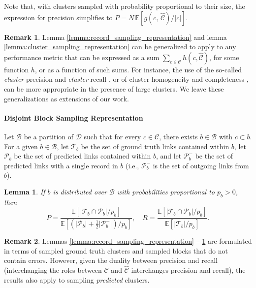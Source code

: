 \documentclass[fontsize=11pt]{article}
\newtheorem{lemma}{Lemma}
\theoremstyle{definition}
\newtheorem{remark}{Remark}
\begin{document}
Note that, with clusters sampled with probability proportional to their size, the expression for precision simplifies to
$
    P = N\, \mathbb{E} \left[ g(c,\, \widehat{\mathcal{C}})/\lvert c \rvert \right].
$

\begin{remark}
    Lemma \ref{lemma:record_sampling_representation} and lemma \ref{lemma:cluster_sampling_representation} can be generalized to apply to any performance metric that can be expressed as a sum $\sum_{c \in \mathcal{C}} h(c, \widehat{\mathcal{C}})$, for some function $h$, or as a function of such sums. For instance, the use of the so-called \textit{cluster} precision and \textit{cluster} recall \citep{Barnes2015}, or of cluster homogeneity and completeness \citep{Barnes2015}, can be more appropriate in the presence of large clusters. We leave these generalizations as extensions of our work.
\end{remark}

\paragraph{Disjoint Block Sampling Representation}

Let $\mathcal{B}$ be a partition of $\mathcal{D}$ such that for every $ c \in \mathcal{C}$, there exists $b \in \mathcal{B}$ with $c \subset b$. For a given $b \in \mathcal{B}$, let $\mathcal{T}_b$ be the set of ground truth links contained within $b$, let $\mathcal{P}_b$ be the set of predicted links contained within $b$, and let $\mathcal{P}_b^{-}$ be the set of predicted links with a single record in $b$ (i.e., $\mathcal{P}_b^{-}$ is the set of outgoing links from $b$).

\begin{lemma}\label{lemma:block_sampling_representation}
If $b$ is distributed over $\mathcal{B}$ with probabilities proportional to $p_b > 0$, then
\begin{equation}\label{eq:lemma_3}
    P = \frac{\mathbb{E}\left[ \lvert \mathcal{T}_b \cap \mathcal{P}_b \rvert / p_b \right]}{\mathbb{E}\left[ (\lvert \mathcal{P}_b \rvert + \tfrac{1}{2} \lvert \mathcal{P}_b^{-} \rvert)/p_b \right]}, \quad R = \frac{\mathbb{E}\left[ \lvert \mathcal{T}_b \cap \mathcal{P}_b \rvert / p_b \right]}{\mathbb{E}\left[ \lvert \mathcal{T}_b \rvert / p_b \right]}.
\end{equation}
\end{lemma}

\begin{remark}
    Lemmas \ref{lemma:record_sampling_representation} -- \ref{lemma:block_sampling_representation} are formulated in terms of sampled ground truth clusters and sampled blocks that do not contain errors. However, given the duality between precision and recall (interchanging the roles between $\mathcal{C}$ and $\widehat{\mathcal{C}}$  interchanges precision and recall), the results also apply to sampling \textit{predicted} clusters.
\end{remark}
\end{document}
